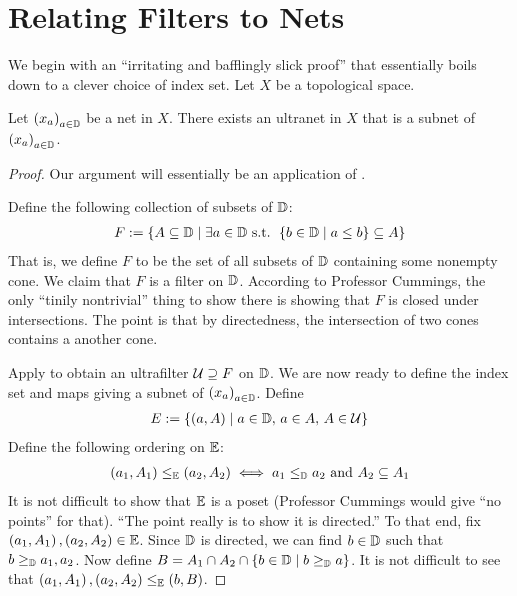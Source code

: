 \section{Relating Filters to Nets}

We begin with an ``irritating and bafflingly slick proof'' that essentially boils down to a clever choice of index set. Let $X$ be a topological space.

\begin{boxtheorem}
    Let $\left( x_a \right)_{a \in \mathbb{D}}$ be a net in $X$. There exists an ultranet in $X$ that is a subnet of $\left( x_a \right)_{a \in \mathbb{D}}$.
\end{boxtheorem}
\begin{proof}
    Our argument will essentially be an application of .

    Define the following collection of subsets of $\mathbb{D}$:
    \begin{align*}
        F := \left\{ A \subseteq \mathbb{D} \; \middle\vert \; \exists a \in \mathbb{D} \text{ s.t. } \left\{ b \in \mathbb{D} \; \middle\vert \; a \leq b \right\} \subseteq A \right\}
    \end{align*}
    That is, we define $F$ to be the set of all subsets of $\mathbb{D}$ containing some nonempty cone. We claim that $F$ is a filter on $\mathbb{D}$. According to Professor Cummings, the only ``tinily nontrivial'' thing to show there is showing that $F$ is closed under intersections. The point is that by directedness, the intersection of two cones contains a another cone.

    Apply  to obtain an ultrafilter $\mathcal{U} \supseteq F$ on $\mathbb{D}$. We are now ready to define the index set and maps giving a subnet of $\left( x_a \right)_{a \in \mathbb{D}}$. Define
    \begin{align*}
        E := \left\{ \left( a, A \right) \; \middle\vert \; a \in \mathbb{D},\, a \in A,\, A \in \mathcal{U} \right\}
    \end{align*}
    Define the following ordering on $\mathbb{E}$:
    \begin{align*}
        \left( a_1, A_1 \right) \leq_{\mathbb{E}} \left( a_2, A_2 \right)
        \iff
        a_1 \leq_{\mathbb{D}} a_2
        \text{ and }
        A_2 \subseteq A_1
    \end{align*}
    It is not difficult to show that $\mathbb{E}$ is a poset (Professor Cummings would give ``no points'' for that). ``The point really is to show it is directed.'' To that end, fix $\left( a_1, A_1 \right), \left( a_2, A_2 \right) \in \mathbb{E}$. Since $\mathbb{D}$ is directed, we can find $b \in \mathbb{D}$ such that $b \geq_{\mathbb{D}} a_1, a_2$. Now define $B = A_1 \cap A_2 \cap \left\{ b \in \mathbb{D} \; \middle\vert \; b \geq_{\mathbb{D}} a \right\}$. It is not difficult to see that $\left( a_1, A_1 \right), \left( a_2, A_2 \right) \leq_{\mathbb{E}} \left( b, B \right)$.


\end{proof}
